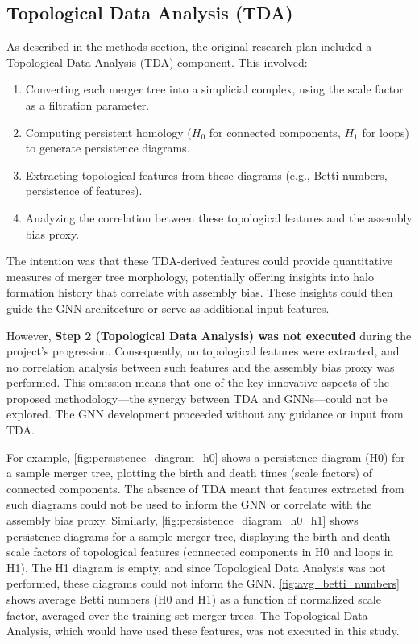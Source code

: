 \documentclass[twocolumn]{aastex631}
\begin{document}
\subsection{Topological Data Analysis (TDA)}

As described in the methods section, the original research plan included a Topological Data Analysis (TDA) component. This involved:
\begin{enumerate}
    \item Converting each merger tree into a simplicial complex, using the scale factor as a filtration parameter.
    \item Computing persistent homology ($H_0$ for connected components, $H_1$ for loops) to generate persistence diagrams.
    \item Extracting topological features from these diagrams (e.g., Betti numbers, persistence of features).
    \item Analyzing the correlation between these topological features and the assembly bias proxy.
\end{enumerate}

The intention was that these TDA-derived features could provide quantitative measures of merger tree morphology, potentially offering insights into halo formation history that correlate with assembly bias. These insights could then guide the GNN architecture or serve as additional input features.

However, \textbf{Step 2 (Topological Data Analysis) was not executed} during the project's progression. Consequently, no topological features were extracted, and no correlation analysis between such features and the assembly bias proxy was performed. This omission means that one of the key innovative aspects of the proposed methodology—the synergy between TDA and GNNs—could not be explored. The GNN development proceeded without any guidance or input from TDA.

For example, \autoref{fig:persistence_diagram_h0} shows a persistence diagram (H0) for a sample merger tree, plotting the birth and death times (scale factors) of connected components. The absence of TDA meant that features extracted from such diagrams could not be used to inform the GNN or correlate with the assembly bias proxy. Similarly, \autoref{fig:persistence_diagram_h0_h1} shows persistence diagrams for a sample merger tree, displaying the birth and death scale factors of topological features (connected components in H0 and loops in H1). The H1 diagram is empty, and since Topological Data Analysis was not performed, these diagrams could not inform the GNN. \autoref{fig:avg_betti_numbers} shows average Betti numbers (H0 and H1) as a function of normalized scale factor, averaged over the training set merger trees. The Topological Data Analysis, which would have used these features, was not executed in this study.
\end{document}
